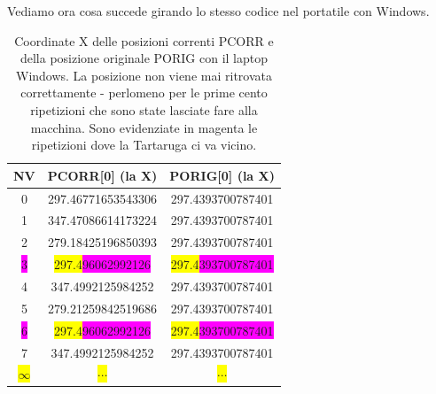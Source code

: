 Vediamo ora cosa succede girando lo stesso codice nel portatile con Windows.

\begin{table}[H]

\begin{center}
\begin{tabular}{| c | c | c |}
\hline
	NV & PCORR[0] (la X) & PORIG[0] (la X) \\ \hline
\hline
0 & 297.46771653543306 & 297.4393700787401 \\ \hline
1 & 347.47086614173224 & 297.4393700787401 \\ \hline
2 & 279.18425196850393 & 297.4393700787401 \\ \hline
\colorbox{magenta}{3} & \colorbox{yellow}{297.4}\colorbox{magenta}{96062992126} & \colorbox{yellow}{297.4}\colorbox{magenta}{393700787401} \\ \hline
4 & 347.4992125984252 & 297.4393700787401 \\ \hline
5 & 279.21259842519686 & 297.4393700787401 \\ \hline
\colorbox{magenta}{6} & \colorbox{yellow}{297.4}\colorbox{magenta}{96062992126} & \colorbox{yellow}{297.4}\colorbox{magenta}{393700787401} \\ \hline
7 & 347.4992125984252 & 297.4393700787401 \\ \hline
\colorbox{yellow}{$\infty$} & \colorbox{yellow}{$\cdots$} & \colorbox{yellow}{$\cdots$} \\
\hline
\end{tabular}
\caption{Coordinate X delle posizioni correnti PCORR e della posizione originale PORIG con il laptop Windows. La posizione non viene mai ritrovata correttamente - perlomeno per le prime cento ripetizioni che sono state lasciate fare alla macchina. Sono evidenziate in magenta le ripetizioni dove la Tartaruga ci va vicino.}
\end{center}
\end{table}

